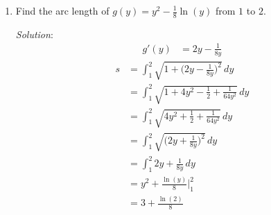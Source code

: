\documentclass[16pt]{article}
\theoremstyle{remark}
\begin{document}
\begin{enumerate}
\item  Find the arc length of  $\displaystyle{g(y) = y^2 - \frac{1}{8}\ln(y)}$ from $\displaystyle{1}$ to $2$.
\begin{mdframed}[style=TheoremFrame]
\textit{Solution}:
\vspace*{-0.5cm}
\begin{align*}
g'(y) &= 2y-\frac{1}{8y}
\end{align*}
\vspace*{-0.5cm}
\begin{align*}
s &= \int_1^2 \sqrt{1+\bigg(2y-\frac{1}{8y}\bigg)^2}\, dy\\
&= \int_1^2 \sqrt{1+4y^2-\frac{1}{2}+\frac{1}{64y^2}}\, dy\\
&= \int_1^2 \sqrt{4y^2+\frac{1}{2}+\frac{1}{64y^2}}\, dy\\
&= \int_1^2 \sqrt{\bigg(2y+\frac{1}{8y}\bigg)^2}\, dy\\
&= \int_1^2 2y+\frac{1}{8y}\, dy\\
&= y^2 + \frac{\ln(y)}{8} \bigg|_1^2\\
&= 3+\frac{\ln(2)}{8}
\end{align*}

\end{mdframed}
\newpage
\end{enumerate}
\end{document}
